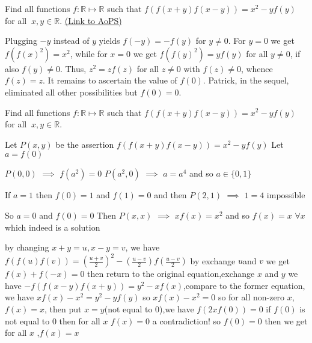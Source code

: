 \begin{problem}
	Find all functions $ f : \mathbb{R} \mapsto \mathbb{R}$ such that $f(f(x+y)f(x-y))=x^2-yf(y)$ for all $ \ x,y \in \mathbb{R}.$
	\flushright \href{https://artofproblemsolving.com/community/c6h463346}{(Link to AoPS)}
\end{problem}



\begin{solution}
	Plugging $-y$ instead of $y$ yields $f(-y) = -f(y)$ for $y\neq 0$. For $y=0$ we get $f(f(x)^2) = x^2$, while for $x=0$ we get $f(f(y)^2) = yf(y)$ for all $y\neq 0$, if also $f(y)\neq 0$. Thus, $z^2 = zf(z)$ for all $z\neq 0$ with $f(z)\neq 0$, whence $f(z)=z$. It remains to ascertain the value of $f(0)$. Patrick, in the sequel, eliminated all other possibilities but $f(0)=0$.
\end{solution}



\begin{solution}
	\begin{tcolorbox}Find all functions $ f : \mathbb{R} \mapsto \mathbb{R}$ such that $f(f(x+y)f(x-y))=x^2-yf(y)$ for all $ \ x,y \in \mathbb{R}.$\end{tcolorbox}
Let $P(x,y)$ be the assertion $f(f(x+y)f(x-y))=x^2-yf(y)$
Let $a=f(0)$

$P(0,0)$ $\implies$ $f(a^2)=0$
$P(a^2,0)$ $\implies$ $a=a^4$ and so $a\in\{0,1\}$

If $a=1$ then $f(0)=1$ and $f(1)=0$ and then $P(2,1)$ $\implies$ $1=4$ impossible

So $a=0$ and $f(0)=0$
Then $P(x,x)$ $\implies$ $xf(x)=x^2$ and so $\boxed{f(x)=x}$ $\forall x$ which indeed is a solution
\end{solution}



\begin{solution}
	by changing $x+y=u,x-y=v$, we have
$f(f(u)f(v))=(\frac{u+v}{2})^{2}-(\frac{u-v}{2})f(\frac{u-v}{2})$ by exchange $u$and $v$ we get $f(x)+f(-x)=0$
then return to the original equation,exchange $x$ and $y$ we have 
$-f(f(x-y)f(x+y))=y^{2}-xf(x)$,compare to the former equation,
we have $xf(x)-x^{2}=y^{2}-yf(y)$ so $xf(x)-x^{2}=0$ so for all non-zero $x$, $f(x)=x$,
then put $x=y$(not equal to $0$),we have $f(2xf(0))=0$ if $f(0)$ is not equal to $0$ then for all $x$ $f(x)=0$ a contradiction! so $f(0)=0$ 
then we get for all $x$ ,$f(x)=x$
\end{solution}



